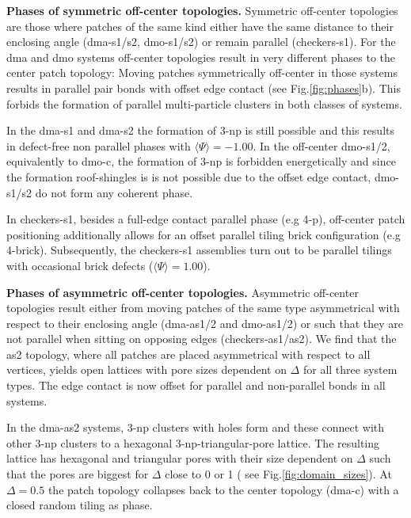 \documentclass[a4paper,twocolumn]{revtex4}
\begin{document}
\textbf{Phases of symmetric off-center topologies.}
Symmetric off-center topologies are those where patches of the same kind either have the same distance to their enclosing angle (dma-s1/s2, dmo-s1/s2) or remain parallel (checkers-s1). 
For the dma and dmo systems off-center topologies result in very different phases to the center patch topology:
Moving patches symmetrically off-center in those systems results in parallel pair bonds with offset edge contact (see Fig.\ref{fig:phases}b). This forbids the formation of parallel multi-particle clusters in both classes of systems. 

In the dma-s1 and dma-s2 the formation of 3-np is still possible and this results in defect-free non parallel phases with $\langle\Psi\rangle=-1.00$.
In the off-center dmo-s1/2, equivalently to dmo-c, the formation of 3-np is forbidden energetically and since the formation roof-shingles is is not possible due to the offset edge contact, dmo-s1/s2 do not form any coherent phase.

In checkers-s1, besides a full-edge contact parallel phase (e.g 4-p), off-center patch positioning additionally allows for an offset parallel tiling brick configuration (e.g 4-brick). Subsequently, the checkers-s1 assemblies turn out to be parallel tilings with occasional brick defects ($\langle\Psi\rangle = 1.00$).



\textbf{Phases of asymmetric off-center topologies.}
Asymmetric off-center topologies result either from moving patches of the same type asymmetrical with respect to their enclosing angle (dma-as1/2 and dmo-as1/2) or such that they are not parallel when sitting on opposing edges (checkers-as1/as2). 
We find that the as2 topology, where all patches are placed asymmetrical with respect to all vertices, yields open lattices with pore sizes dependent on $\Delta$ for all three system types. 
The edge contact is now offset for parallel and non-parallel bonds in all systems. 

In the dma-as2 systems, 3-np clusters with holes form and these connect with other 3-np clusters to a hexagonal 3-np-triangular-pore lattice. The resulting lattice has hexagonal and triangular pores with their size dependent on $\Delta$ such that the pores are biggest for $\Delta$ close to 0 or 1 ( see Fig.\ref{fig:domain_sizes}). At $\Delta=0.5$ the patch topology collapses back to the center topology (dma-c) with a closed random tiling as phase.
\end{document}
